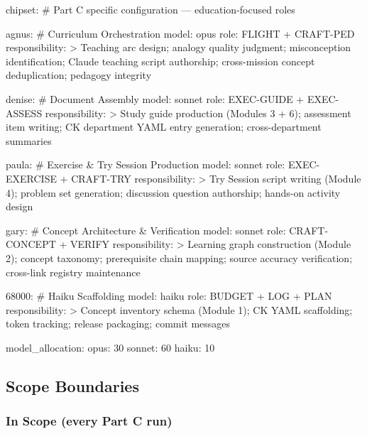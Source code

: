 \documentclass[11pt,letterpaper]{article}
\begin{document}
\begin{asciibox}
chipset:
  # Part C specific configuration — education-focused roles

  agnus:              # Curriculum Orchestration
    model: opus
    role: FLIGHT + CRAFT-PED
    responsibility: >
      Teaching arc design; analogy quality judgment; misconception
      identification; Claude teaching script authorship; cross-mission
      concept deduplication; pedagogy integrity

  denise:             # Document Assembly
    model: sonnet
    role: EXEC-GUIDE + EXEC-ASSESS
    responsibility: >
      Study guide production (Modules 3 + 6); assessment item writing;
      CK department YAML entry generation; cross-department summaries

  paula:              # Exercise & Try Session Production
    model: sonnet
    role: EXEC-EXERCISE + CRAFT-TRY
    responsibility: >
      Try Session script writing (Module 4); problem set generation;
      discussion question authorship; hands-on activity design

  gary:               # Concept Architecture & Verification
    model: sonnet
    role: CRAFT-CONCEPT + VERIFY
    responsibility: >
      Learning graph construction (Module 2); concept taxonomy;
      prerequisite chain mapping; source accuracy verification;
      cross-link registry maintenance

  68000:              # Haiku Scaffolding
    model: haiku
    role: BUDGET + LOG + PLAN
    responsibility: >
      Concept inventory schema (Module 1); CK YAML scaffolding;
      token tracking; release packaging; commit messages

model_allocation:
  opus: 30%
  sonnet: 60%
  haiku: 10%
\end{asciibox}

\subsection{Scope Boundaries}

\subsubsection{In Scope (every Part C run)}
\end{document}
